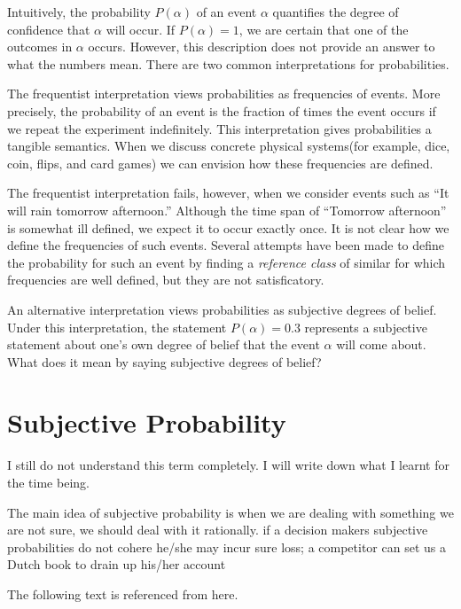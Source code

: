 \documentclass[a4paper]{book}
\begin{document}
	Intuitively, the probability $P(\alpha)$ of an event $\alpha$
	quantifies the degree of confidence that $\alpha$ will occur. If
	$P(\alpha) = 1$, we are certain that one of the outcomes in $\alpha$
	occurs. However, this description does not provide an answer to what
	the numbers mean. There are two common interpretations for
	probabilities.\cite{koller2009probabilistic}

	The frequentist interpretation views probabilities as frequencies of
	events. More precisely, the probability of an event is the fraction of
	times the event occurs if we repeat the experiment indefinitely. This
	interpretation gives probabilities a tangible semantics. When we
	discuss concrete physical systems(for example, dice, coin, flips, and
	card games) we can envision how these frequencies are
	defined.\cite{koller2009probabilistic}

	The frequentist interpretation fails, however, when we consider events
	such as ``It will rain tomorrow afternoon.'' Although the time span of
	``Tomorrow afternoon'' is somewhat ill defined, we expect it to occur
	exactly once. It is not clear how we define the frequencies of such
	events. Several attempts have been made to define the probability for
	such an event by finding a \textit{reference class} of similar for
	which frequencies are well defined, but they are not
	satisficatory.\cite{koller2009probabilistic}

	An alternative interpretation views probabilities as subjective
	degrees of belief. Under this interpretation, the statement $P(\alpha)
	= 0.3$ represents a subjective statement about one's own degree of
	belief that the event $\alpha$ will come
	about.\cite{koller2009probabilistic} What does it mean by saying
	subjective degrees of belief?

\section{Subjective Probability}
	I still do not understand this term completely. I will write down what
	I learnt for the time being.

	The main idea of subjective probability is when we are dealing with
	something we are not sure, we should deal with it rationally.  if a
	decision makers subjective probabilities do not cohere he/she may
	incur sure loss; a competitor can set us a Dutch book to drain up
	his/her account

	The following text is referenced from here\cite{hogg2012introduction}.
\end{document}
